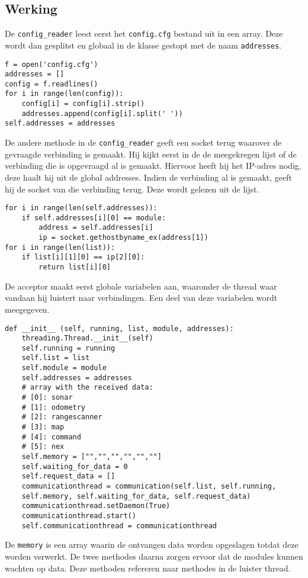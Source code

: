 \documentclass[a4paper,10pt]{article}
\begin{document}
\subsection*{Werking}
De \verb!config_reader! leest eerst het \verb!config.cfg! bestand uit in een array. Deze wordt dan gesplitst en globaal in de klasse gestopt met de naam \verb!addresses!.
\begin{verbatim}
f = open('config.cfg')
addresses = []
config = f.readlines()
for i in range(len(config)):
    config[i] = config[i].strip()
    addresses.append(config[i].split(' '))
self.addresses = addresses
\end{verbatim}
De andere methode in de \verb!config_reader! geeft een socket terug waarover de gevraagde verbinding is gemaakt. Hij kijkt eerst in de de meegekregen lijst of de verbinding die is opgevraagd al is gemaakt. Hiervoor heeft hij het IP-adres nodig, deze haalt hij uit de global addresses. Indien de verbinding al is gemaakt, geeft hij de socket van die verbinding terug. Deze wordt gelezen uit de lijst.
\begin{verbatim}
for i in range(len(self.addresses)):
    if self.addresses[i][0] == module:
        address = self.addresses[i]
        ip = socket.gethostbyname_ex(address[1])
for i in range(len(list)):
    if list[i][1][0] == ip[2][0]:
        return list[i][0]
\end{verbatim}
De acceptor maakt eerst globale variabelen aan, waaronder de thread waar vandaan hij luistert naar verbindingen. Een deel van deze variabelen wordt meegegeven.
\begin{verbatim}
def __init__ (self, running, list, module, addresses):
    threading.Thread.__init__(self)
    self.running = running
    self.list = list
    self.module = module
    self.addresses = addresses
    # array with the received data:
    # [0]: sonar
    # [1]: odometry
    # [2]: rangescanner
    # [3]: map
    # [4]: command
    # [5]: nex        
    self.memory = ["","","","","",""]
    self.waiting_for_data = 0
    self.request_data = []
    communicationthread = communication(self.list, self.running, 
    self.memory, self.waiting_for_data, self.request_data)
    communicationthread.setDaemon(True)
    communicationthread.start()
    self.communicationthread = communicationthread
\end{verbatim}
De \verb!memory! is een array waarin de ontvangen data worden opgeslagen totdat deze worden verwerkt.
De twee methodes daarna zorgen ervoor dat de modules kunnen wachten op data. Deze methoden refereren naar methodes in de luister thread.
\end{document}
